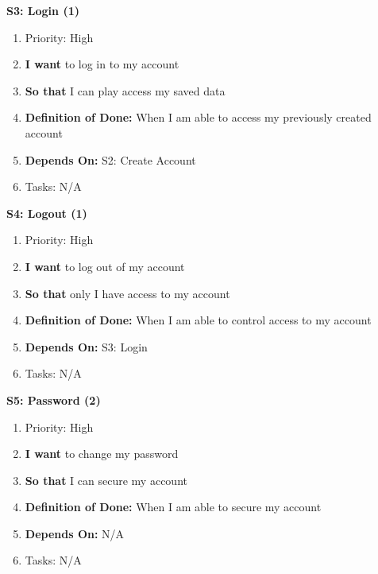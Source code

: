 \textbf{S3: Login (1)}
\begin{enumerate}
    \item Priority: High
    \item \textbf{I want} to log in to my account
    \item \textbf{So that} I can play access my saved data
    \item \textbf{Definition of Done:} When I am able to access my previously created account
    \item \textbf{Depends On:} S2: Create Account
    \item Tasks: N/A
\end{enumerate}


\textbf{S4: Logout (1)}
\begin{enumerate}
    \item Priority: High
    \item \textbf{I want} to log out of my account
    \item \textbf{So that} only I have access to my account
    \item \textbf{Definition of Done:} When I am able to control access to my account
    \item \textbf{Depends On:} S3: Login
    \item Tasks: N/A
\end{enumerate}


\textbf{S5: Password (2)}
\begin{enumerate}
    \item Priority: High
    \item \textbf{I want} to change my password
    \item \textbf{So that} I can secure my account
    \item \textbf{Definition of Done:} When I am able to secure my account
    \item \textbf{Depends On:} N/A
    \item Tasks: N/A
\end{enumerate}


